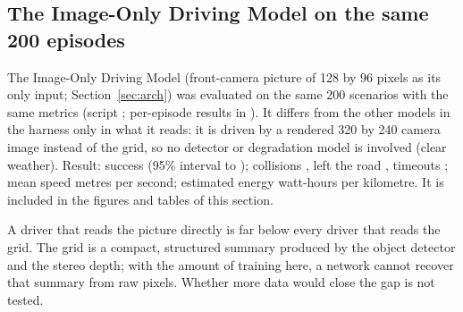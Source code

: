 \subsection{The Image-Only Driving Model on the same 200 episodes}
The Image-Only Driving Model (front-camera picture of 128 by 96 pixels as its only input; Section~\ref{sec:arch}) was evaluated on the same 200 scenarios with the same metrics (script ; per-episode results in ). It differs from the other models in the harness only in what it reads: it is driven by a rendered 320 by 240 camera image instead of the grid, so no detector or degradation model is involved (clear weather).
Result: success \ImOnSuccess{} (95\% interval \ImOnLow{} to \ImOnHigh{}); collisions \ImOnCollision{}, left the road \ImOnOffroad{}, timeouts \ImOnTimeout{}; mean speed \ImOnSpeed{} metres per second; estimated energy \ImOnEnergy{} watt-hours per kilometre. It is included in the figures and tables of this section.
\begin{implicationbox}
A driver that reads the picture directly is far below every driver that reads the grid. The grid is a compact, structured summary produced by the object detector and the stereo depth; with the amount of training here, a network cannot recover that summary from raw pixels. Whether more data would close the gap is not tested.
\end{implicationbox}

